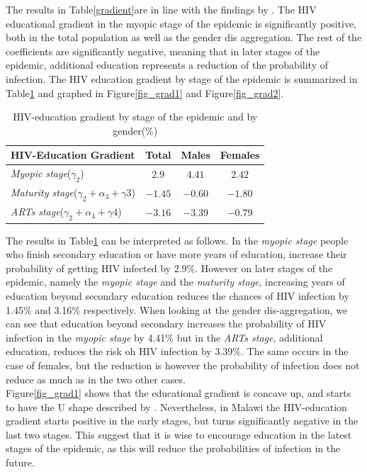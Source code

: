 The results in Table\ref{gradient}are in line with the findings by \cite{raul}. The HIV educational gradient in the myopic stage of the epidemic is significantly positive, both in the total population as well as the gender dis aggregation. The rest of the coefficients are significantly negative, meaning that in later stages of the epidemic, additional education represents a reduction of the probability of infection. The HIV education gradient by stage of the epidemic is summarized in Table\ref{gredient} and graphed in Figure\ref{fig_grad1} and Figure\ref{fig_grad2}.

 \begin{table}[H]
 \centering
 \caption{HIV-education gradient by stage of the epidemic and by gender($\%$)}
\label{gredient}
\begin{tabular}{>{\arraybackslash}m{6cm}|c|c|c}
\hline
 \textbf{HIV-Education Gradient}& \textbf{Total} & \textbf{Males}& \textbf{Females} \\
 \hline\hline
 \textit{Myopic stage}($\gamma_{2}$)& $2.9$ & $4.41$& $2.42$\\
 [0.25em]
 \textit{Maturity stage}($\gamma_{2}+\alpha_{3}+\gamma{3}$)&$-1.45$ & $-0.60$& $-1.80$ 
 \\ 
 [0.25em]
 \textit{ARTs stage}($\gamma_{2}+\alpha_{4}+\gamma{4}$)
 & $-3.16$& $-3.39$& $-0.79$\\
 \hline\hline
\end{tabular}
\end{table}

The results in Table\ref{gredient} can be interpreted as follows. In the \textit{myopic stage} people who finish secondary education or have more years of education, increase their probability of getting HIV infected by 2.9$\%$. However on later stages of the epidemic, namely the \textit{myopic stage} and the \textit{maturity stage}, increasing years of education beyond secondary education reduces the chances of HIV infection by 1.45$\%$ and 3.16$\%$ respectively. When looking at the gender dis-aggregation, we can see that education beyond secondary increases the probability of HIV infection in the \textit{myopic stage} by 4.41$\%$ but in the \textit{ARTs stage}, additional education, reduces the risk oh HIV infection by 3.39$\%$. The same occurs in the case of females, but the reduction is however the probability of infection does not reduce as much as in the two other cases.\\

Figure\ref{fig_grad1} shows that the educational gradient is concave up, and starts to have the U shape described by \cite{raul}. Nevertheless, in Malawi the HIV-education gradient starts positive in the early stages, but turns significantly negative in the last two stages. This suggest that it is wise to encourage education in the latest stages of the epidemic, as this will reduce the probabilities of infection in the future.\\

